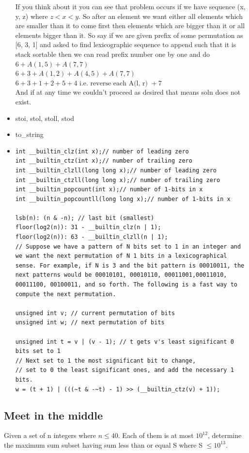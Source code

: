 \documentclass[8pt, a4paper, oneside, twocolumn]{extarticle}
\begin{document}
\begin{itemize}
\begin{enumerate}
    \end{enumerate}
    If you think about it you can see that problem occurs if we have sequence (x, y, z) where $z < x < y$. So after an element we want either all elements which are smaller than it to come first then elements which are bigger than it or all elements bigger than it. So say if we are given prefix of some permutation as [6, 3, 1] and asked to find lexicographic sequence to append such that it is stack sortable then we can read prefix number one by one and do\\
    $6 + A(1, 5) + A(7, 7)$\\
    $6 + 3 + A(1, 2) + A(4, 5) + A(7, 7)$\\
    $6 + 3 + 1 + 2 + 5 + 4 \text{ i.e. reverse each A(l, r) } + 7$\\
    And if at any time we couldn't proceed as desired that means soln does not exist.
    \item stoi, stol, stoll, stod
    \item to\_{}string
    \item 
    \begin{verbatim}
int __builtin_clz(int x);// number of leading zero
int __builtin_ctz(int x);// number of trailing zero
int __builtin_clzll(long long x);// number of leading zero
int __builtin_ctzll(long long x);// number of trailing zero
int __builtin_popcount(int x);// number of 1-bits in x
int __builtin_popcountll(long long x);// number of 1-bits in x

lsb(n): (n & -n); // last bit (smallest)
floor(log2(n)): 31 - __builtin_clz(n | 1);
floor(log2(n)): 63 - __builtin_clzll(n | 1);
// Suppose we have a pattern of N bits set to 1 in an integer and we want the next permutation of N 1 bits in a lexicographical sense. For example, if N is 3 and the bit pattern is 00010011, the next patterns would be 00010101, 00010110, 00011001,00011010, 00011100, 00100011, and so forth. The following is a fast way to compute the next permutation.

unsigned int v; // current permutation of bits 
unsigned int w; // next permutation of bits

unsigned int t = v | (v - 1); // t gets v's least significant 0 bits set to 1
// Next set to 1 the most significant bit to change, 
// set to 0 the least significant ones, and add the necessary 1 bits.
w = (t + 1) | (((~t & -~t) - 1) >> (__builtin_ctz(v) + 1));  
    \end{verbatim}
\end{itemize}
\subsection{Meet in the middle}
Given a set of n integers where $n \leq 40$. Each of them is at most $10^{12}$, determine the maximum sum subset having sum less than or equal S where S $\leq 10^{13}$.
\end{document}
